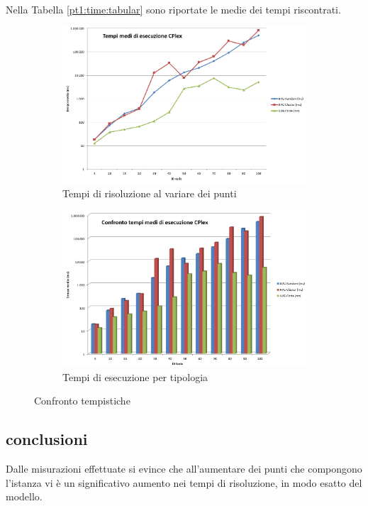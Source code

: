 Nella Tabella \ref{pt1:time:tabular} sono riportate le medie dei tempi riscontrati.

\begin{figure}
\centering
\begin{subfigure}[b]{0.9\textwidth}
\includegraphics[width=\textwidth]{Images/Part_1/graphics/Times01.png}
\caption{Tempi di risoluzione al variare dei punti}
\label{pt1:time:time01}
\end{subfigure}

\begin{subfigure}[b]{0.9\textwidth}
\includegraphics[width=\textwidth]{Images/Part_1/graphics/Times02.png}
\caption{Tempi di esecuzione per tipologia}
\label{pt1:time:time02}
\end{subfigure}
\caption{Confronto tempistiche}
\label{pt1:time:times}
\end{figure}

\subsection[Conclusioni]{conclusioni}
\label{pt1:time:conclusion}
Dalle misurazioni effettuate si evince che all'aumentare dei punti che compongono l'istanza vi è un significativo aumento nei tempi di risoluzione, in modo esatto del modello.

